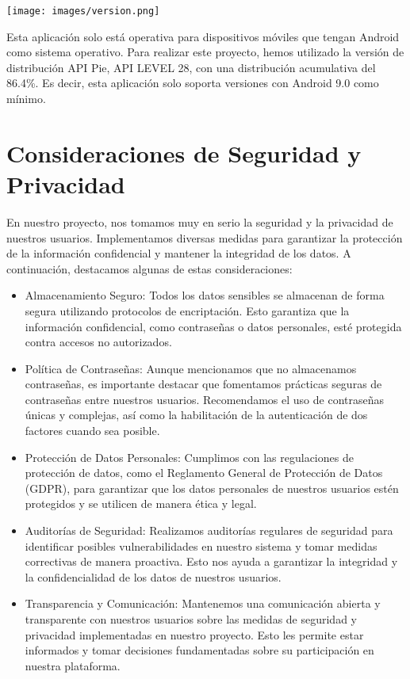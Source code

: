 \documentclass{article}
\begin{document}
    \begin{minipage}{0.4\textwidth}
        \texttt{[image: images/version.png]}
    \end{minipage}
    \hfill
    \begin{minipage}{0.55\textwidth}
    Esta aplicación solo está operativa para dispositivos móviles que tengan Android como sistema operativo. Para realizar este proyecto, hemos utilizado la versión de distribución API Pie, API LEVEL 28, con una distribución acumulativa del 86.4\%. Es decir, esta aplicación solo soporta versiones con Android 9.0 como mínimo.
    \end{minipage}

\section{Consideraciones de Seguridad y Privacidad}

    En nuestro proyecto, nos tomamos muy en serio la seguridad y la privacidad de nuestros usuarios. Implementamos diversas medidas para garantizar la protección de la información confidencial y mantener la integridad de los datos. A continuación, destacamos algunas de estas consideraciones:
    
    \begin{itemize}
        \item Almacenamiento Seguro: Todos los datos sensibles se almacenan de forma segura utilizando protocolos de encriptación. Esto garantiza que la información confidencial, como contraseñas o datos personales, esté protegida contra accesos no autorizados.
    
        \item Política de Contraseñas: Aunque mencionamos que no almacenamos contraseñas, es importante destacar que fomentamos prácticas seguras de contraseñas entre nuestros usuarios. Recomendamos el uso de contraseñas únicas y complejas, así como la habilitación de la autenticación de dos factores cuando sea posible.
    
        \item Protección de Datos Personales: Cumplimos con las regulaciones de protección de datos, como el Reglamento General de Protección de Datos (GDPR), para garantizar que los datos personales de nuestros usuarios estén protegidos y se utilicen de manera ética y legal.
    
        \item Auditorías de Seguridad: Realizamos auditorías regulares de seguridad para identificar posibles vulnerabilidades en nuestro sistema y tomar medidas correctivas de manera proactiva. Esto nos ayuda a garantizar la integridad y la confidencialidad de los datos de nuestros usuarios.
    
        \item Transparencia y Comunicación: Mantenemos una comunicación abierta y transparente con nuestros usuarios sobre las medidas de seguridad y privacidad implementadas en nuestro proyecto. Esto les permite estar informados y tomar decisiones fundamentadas sobre su participación en nuestra plataforma.
        
    \end{itemize}
    
\end{document}
